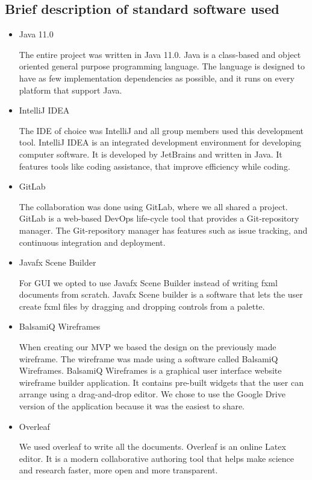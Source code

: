 \subsection{Brief description of standard software used}
\begin{itemize}
    \item Java 11.0
    
    The entire project was written in Java 11.0. Java is a class-based and object oriented general purpose programming language. The language is designed to have as few implementation dependencies as possible, and it runs on every platform that support Java. \cite{website:JavaWikipedia}
    \item IntelliJ IDEA
    
    The IDE of choice was IntelliJ and all group members used this development tool. IntelliJ IDEA is an integrated development environment for developing computer software. It is developed by JetBrains and written in Java. It features tools like coding assistance, that improve efficiency while coding. \cite{website:Jetbrains}
    \item GitLab 
    
    The collaboration was done using GitLab, where we all shared a project. GitLab is a web-based DevOps life-cycle tool that provides a Git-repository manager. The Git-repository manager has features such as issue tracking, and continuous integration and deployment. \cite{website:Gitlab} 
    \item Javafx Scene Builder
    
    For GUI we opted to use Javafx Scene Builder instead of writing fxml documents from scratch. Javafx Scene builder is a software that lets the user create fxml files by dragging and dropping controls from a palette.
    \item BalsamiQ Wireframes 
    
    When creating our MVP we based the design on the previously made wireframe. The wireframe was made using a software called BalsamiQ Wireframes. BalsamiQ Wireframes is a graphical user interface website wireframe builder application. It contains pre-built widgets that the user can arrange using a drag-and-drop editor. We chose to use the Google Drive version of the application because it was the easiest to share.\cite{website:SceneBuilder}
    
    \item Overleaf
    
    We used overleaf to write all the documents. Overleaf is an online Latex editor. It is a modern collaborative authoring tool that helps make science and research faster, more open and more transparent. \cite{website:Overleaf}
\end{itemize}{}